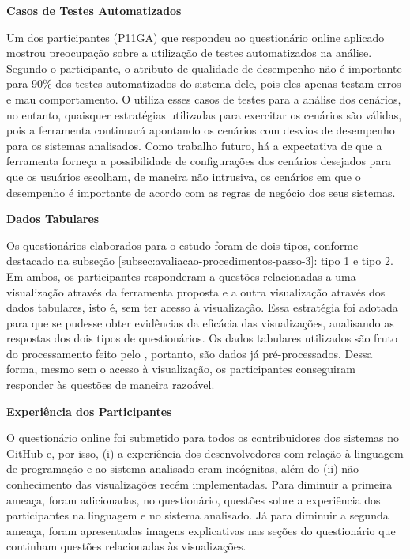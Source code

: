 \noindent \textbf{Casos de Testes Automatizados} \label{subsec:avaliacao-consideracoes-testes-unitarios}

Um dos participantes (P11GA) que respondeu ao questionário online aplicado mostrou preocupação sobre a utilização de testes automatizados na análise. Segundo o participante, o atributo de qualidade de desempenho não é importante para 90\% dos testes automatizados do sistema dele, pois eles apenas testam erros e mau comportamento. O \textit{\perfMinerName} utiliza esses casos de testes para a análise dos cenários, no entanto, quaisquer estratégias utilizadas para exercitar os cenários são válidas, pois a ferramenta continuará apontando os cenários com desvios de desempenho para os sistemas analisados. Como trabalho futuro, há a expectativa de que a ferramenta forneça a possibilidade de configurações dos cenários desejados para que os usuários escolham, de maneira não intrusiva, os cenários em que o desempenho é importante de acordo com as regras de negócio dos seus sistemas.

\noindent \textbf{Dados Tabulares}

Os questionários elaborados para o estudo foram de dois tipos, conforme destacado na subseção \ref{subsec:avaliacao-procedimentos-passo-3}: tipo 1 e tipo 2. Em ambos, os participantes responderam a questões relacionadas a uma visualização através da ferramenta proposta e a outra visualização através dos dados tabulares, isto é, sem ter acesso à visualização. Essa estratégia foi adotada para que se pudesse obter evidências da eficácia das visualizações, analisando as respostas dos dois tipos de questionários. Os dados tabulares utilizados são fruto do processamento feito pelo \textit{\perfMinerName}, portanto, são dados já pré-processados. Dessa forma, mesmo sem o acesso à visualização, os participantes conseguiram responder às questões de maneira razoável.

\hfill

\noindent \textbf{Experiência dos Participantes}

O questionário online foi submetido para todos os contribuidores dos sistemas no GitHub e, por isso, (i) a experiência dos desenvolvedores com relação à linguagem de programação e ao sistema analisado eram incógnitas, além do (ii) não conhecimento das visualizações recém implementadas. Para diminuir a primeira ameaça, foram adicionadas, no questionário, questões sobre a experiência dos participantes na linguagem e no sistema analisado. Já para diminuir a segunda ameaça, foram apresentadas imagens explicativas nas seções do questionário que continham questões relacionadas às visualizações.

